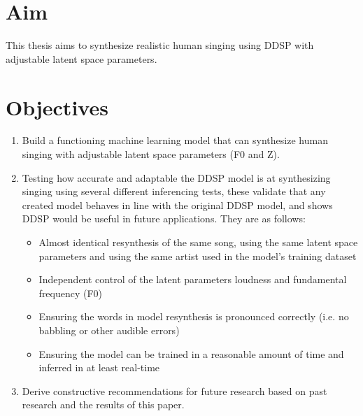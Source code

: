 \section{Aim}

This thesis aims to synthesize realistic human singing using DDSP with adjustable latent space parameters.

\section{Objectives}

\begin{enumerate}
    \item Build a functioning machine learning model that can synthesize human singing with adjustable latent space parameters (F0 and Z).
    \item Testing how accurate and adaptable the DDSP model is at synthesizing singing using several different inferencing tests, these validate that any created model behaves in line with the original DDSP model\cite{OriginalDDSP}, and shows DDSP would be useful in future applications. They are as follows:
    \begin{itemize}
        \item Almost identical resynthesis of the same song, using the same latent space parameters and using the same artist used in the model's training dataset
        \item Independent control of the latent parameters loudness and fundamental frequency (F0)
        \item Ensuring the words in model resynthesis is pronounced correctly (i.e. no babbling or other audible errors)
        \item Ensuring the model can be trained in a reasonable amount of time and inferred in at least real-time
    \end{itemize}
    \item Derive constructive recommendations for future research based on past research and the results of this paper.
\end{enumerate}